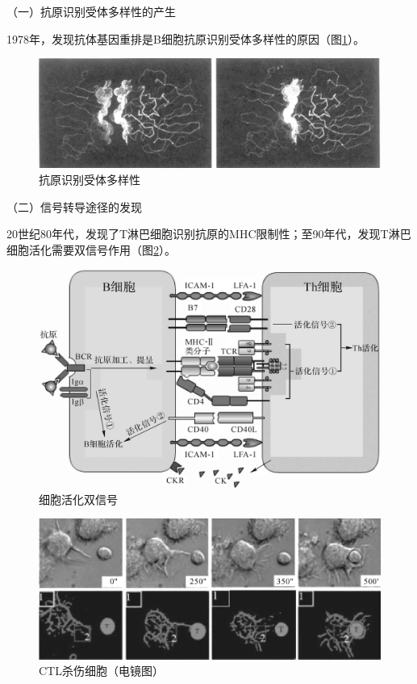 （一）抗原识别受体多样性的产生

1978年，发现抗体基因重排是B细胞抗原识别受体多样性的原因（图\ref{fig1-11}）。

\begin{figure}[!htbp]
 \centering
 \includegraphics[scale=1.1]{./images/Image00018.jpg}
 \caption{抗原识别受体多样性}
 \label{fig1-11}
  \end{figure} 

（二）信号转导途径的发现

20世纪80年代，发现了T淋巴细胞识别抗原的MHC限制性；至90年代，发现T淋巴细胞活化需要双信号作用（图\ref{fig1-12}）。

\begin{figure}[!htbp]
 \centering
 \includegraphics[scale=1.2]{./images/Image00019.jpg}
 \caption{细胞活化双信号}
 \label{fig1-12}
  \end{figure} 

\begin{figure}[!htbp]
 \centering
 \includegraphics{./images/Image00020.jpg}
 \caption{CTL杀伤细胞（电镜图）}
 \label{fig1-13}
  \end{figure} 

